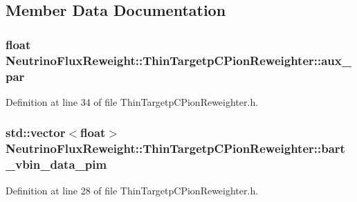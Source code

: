 \subsection{Member Data Documentation}
\hypertarget{class_neutrino_flux_reweight_1_1_thin_targetp_c_pion_reweighter_a87d4a2cfb3ce6e4e5c7f0f3be1144915}{
\subsubsection[{aux\-\_\-par}]{\setlength{\rightskip}{0pt plus 5cm}float Neutrino\-Flux\-Reweight\-::\-Thin\-Targetp\-C\-Pion\-Reweighter\-::aux\-\_\-par\hspace{0.3cm}{\ttfamily [private]}}}\label{class_neutrino_flux_reweight_1_1_thin_targetp_c_pion_reweighter_a87d4a2cfb3ce6e4e5c7f0f3be1144915}


Definition at line 34 of file Thin\-Targetp\-C\-Pion\-Reweighter.\-h.

\hypertarget{class_neutrino_flux_reweight_1_1_thin_targetp_c_pion_reweighter_a9d7ffcf3ca0c5a7b0f1c37435cc86403}{
\subsubsection[{bart\-\_\-vbin\-\_\-data\-\_\-pim}]{\setlength{\rightskip}{0pt plus 5cm}std\-::vector$<$float$>$ Neutrino\-Flux\-Reweight\-::\-Thin\-Targetp\-C\-Pion\-Reweighter\-::bart\-\_\-vbin\-\_\-data\-\_\-pim}}\label{class_neutrino_flux_reweight_1_1_thin_targetp_c_pion_reweighter_a9d7ffcf3ca0c5a7b0f1c37435cc86403}


Definition at line 28 of file Thin\-Targetp\-C\-Pion\-Reweighter.\-h.


